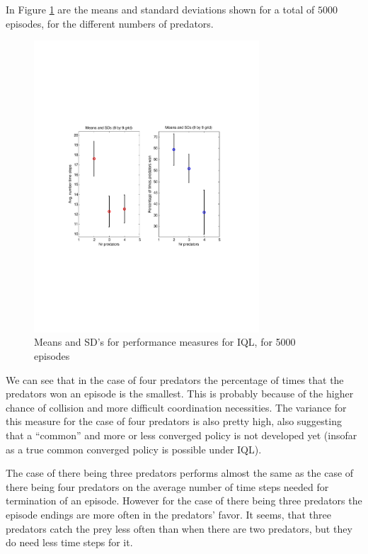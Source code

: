 In Figure \ref{fig:IQLmeansSds} are the means and standard deviations shown for a total of $5000$ episodes, for the different numbers of predators.

\begin{figure}[htb]
\centering
\includegraphics[bb = 0.6in 3in 7.9in 8.5in,clip,width=0.75\textwidth]{IQLgrid9by9ErrorBars.pdf} 
\caption{Means and SD's for performance measures for IQL, for 5000 episodes}
\label{fig:IQLmeansSds}
\end{figure}



We can see that in the case of four predators the percentage of times that the predators won an episode is the smallest. This is probably because of the higher chance of collision and more difficult coordination necessities. The variance for this measure for the case of four predators is also pretty high, also suggesting that a  ``common'' and more or less converged policy is not developed yet (insofar as a true common converged policy is possible under IQL). 

The case of there being three predators performs almost the same as the case of there being four predators on the average number of time steps  needed for termination of an episode. However for the case of there being three predators the episode endings are more often in the predators' favor. It seems, that three predators catch the prey less often than when there are two predators, but they do need less time steps for it.
 

